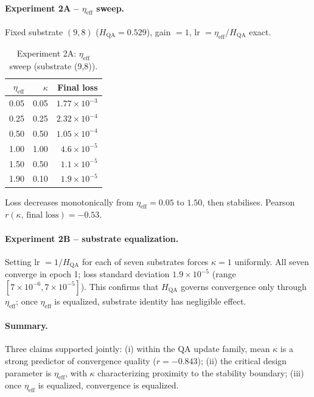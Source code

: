 \documentclass[11pt]{article}
\theoremstyle{definition}
\theoremstyle{remark}
\newcommand{\hqa}{H_{\mathrm{QA}}}
\newcommand{\etaeff}{\eta_{\mathrm{eff}}}
\begin{document}
\paragraph{Experiment 2A -- $\eta_{\mathrm{eff}}$ sweep.}
Fixed substrate $(9,8)$ ($\hqa=0.529$), gain $=1$, lr $=\etaeff/\hqa$ exact.

\begin{table}[h]
\centering
\caption{Experiment 2A: $\eta_{\mathrm{eff}}$ sweep (substrate (9,8)).}
\begin{tabular}{rrr}
\toprule
$\etaeff$ & $\kappa$ & Final loss \\
\midrule
0.05 & 0.05 & $1.77\times10^{-3}$ \\
0.25 & 0.25 & $2.32\times10^{-4}$ \\
0.50 & 0.50 & $1.05\times10^{-4}$ \\
1.00 & 1.00 & $4.6\times10^{-5}$ \\
1.50 & 0.50 & $1.1\times10^{-5}$ \\
1.90 & 0.10 & $1.9\times10^{-5}$ \\
\bottomrule
\end{tabular}
\end{table}

Loss decreases monotonically from $\etaeff=0.05$ to $1.50$, then stabilises.
Pearson $r(\kappa,\,\text{final loss})=-0.53$.

\paragraph{Experiment 2B -- substrate equalization.}
Setting lr $=1/\hqa$ for each of seven substrates forces $\kappa=1$ uniformly.
All seven converge in epoch 1; loss standard deviation $1.9\times10^{-5}$
(range $[7\times10^{-6},7\times10^{-5}]$). This confirms that $\hqa$ governs
convergence only through $\etaeff$; once $\etaeff$ is equalized, substrate
identity has negligible effect.

\paragraph{Summary.}
Three claims supported jointly: (i) within the QA update family, mean $\kappa$ is
a strong predictor of convergence quality ($r=-0.843$); (ii) the critical design
parameter is $\etaeff$, with $\kappa$ characterizing proximity to the stability
boundary; (iii) once $\etaeff$ is equalized, convergence is equalized.
\end{document}

